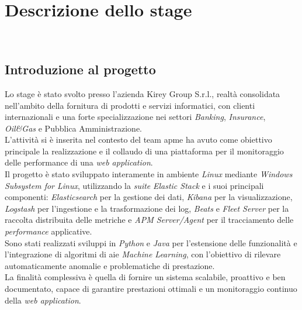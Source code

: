 \chapter{Descrizione dello stage}
\label{cap:descrizione-stage}

\\

\section{Introduzione al progetto}
Lo stage è stato svolto presso l'azienda Kirey Group S.r.l., realtà consolidata nell'ambito della fornitura di prodotti e servizi informatici, con clienti internazionali e una forte specializzazione nei settori \emph{Banking}, \emph{Insurance}, \emph{Oil\&Gas} e Pubblica Amministrazione. \\ 
L'attività si è inserita nel contesto del team \gls{apm}\glsfirstoccur e ha avuto come obiettivo principale la realizzazione e il collaudo di una piattaforma per il monitoraggio delle performance di una \emph{web application}. \\
Il progetto è stato sviluppato interamente in ambiente \emph{Linux} mediante \emph{Windows Subsystem for Linux}, utilizzando la \emph{suite} \emph{Elastic Stack} e i suoi principali componenti: \emph{Elasticsearch} per la gestione dei dati, \emph{Kibana} per la visualizzazione, \emph{Logstash} per l'ingestione e la trasformazione dei log, \emph{Beats} e \emph{Fleet Server} per la raccolta distribuita delle metriche e \emph{APM Server/Agent} per il tracciamento delle \emph{performance} applicative. \\ 
Sono stati realizzati sviluppi in \emph{Python} e \emph{Java} per l'estensione delle funzionalità e l'integrazione di algoritmi di \gls{ai}\glsfirstoccur e \emph{Machine Learning}, con l'obiettivo di rilevare automaticamente anomalie e problematiche di prestazione. \\   
La finalità complessiva è quella di fornire un sistema scalabile, proattivo e ben documentato, capace di garantire prestazioni ottimali e un monitoraggio continuo della \emph{web application}.  


